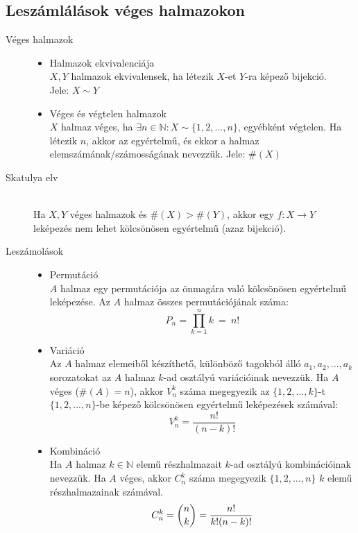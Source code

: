 \documentclass[margin=0px]{article}
\newcommand{\N}{\mathbb{N}}
\begin{document}
\subsection{Leszámlálások véges halmazokon}
\begin{description}
    \item[Véges halmazok] \hfill
        \begin{itemize}
            \item Halmazok ekvivalenciája \\
                  $X,Y$ halmazok ekvivalensek, ha létezik $X$-et $Y$-ra képező bijekció.\\
                  Jele: $X \sim Y$
            \item Véges és végtelen halmazok \\
                  $X$ halmaz véges, ha $\exists n\in\N : X \sim \{1,2,...,n\}$, egyébként végtelen. Ha létezik $n$, akkor az egyértelmű, és ekkor a halmaz elemszámának/számosságának nevezzük. Jele: $ \#(X)$
        \end{itemize}
    \item[Skatulya elv] \hfill \\
        Ha $X,Y$ véges halmazok és $\#(X) > \#(Y)$, akkor egy $f:X\rightarrow Y$ leképezés nem lehet kölcsönösen egyértelmű (azaz bijekció).
    \item[Leszámolások] \hfill
        \begin{itemize}
            \item Permutáció \\
                  $A$ halmaz egy permutációja az önmagára való kölcsönösen egyértelmű leképezése. Az $A$ halmaz összes permutációjának száma:
                  \[P_n = \prod\limits_{k=1}^{n} k \ = \ n!\]
            \item Variáció \\
                  Az $A$ halmaz elemeiből készíthető, különböző tagokból álló $a_1,a_2,...,a_k$ sorozatokat az $A$ halmaz $k$-ad osztályú variációinak nevezzük. Ha $A$ véges ($\#(A) = n$), akkor $V_n^k$ száma megegyezik az $\{1,2,...,k\}$-t $\{1,2,...,n\}$-be képező kölcsönösen egyértelmű leképezések számával:
                  \[ V_n^k = \frac{n!}{(n-k)!}\]
            \item Kombináció \\
                  Ha $A$ halmaz $k\in\N$ elemű részhalmazait $k$-ad osztályú kombinációinak nevezzük. Ha $A$ véges, akkor $C_n^k$ száma megegyezik $\{1,2,...,n\}$ $k$ elemű részhalmazainak számával.
                  \[C_n^k = \dbinom{n}{k} = \frac{n!}{k!(n-k)!}\]

\end{itemize}
\end{description}
\end{document}
